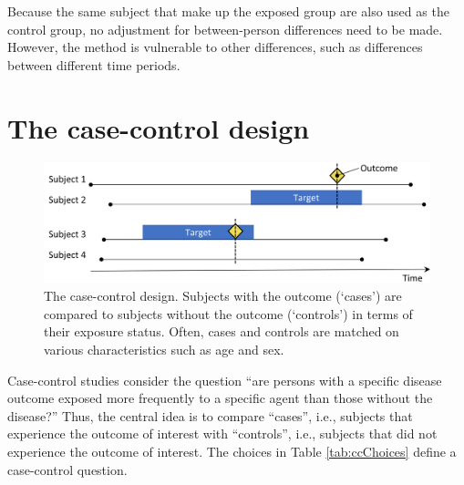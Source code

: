 \documentclass[11pt]{book}
\begin{document}
Because the same subject that make up the exposed group are also used as
the control group, no adjustment for between-person differences need to
be made. However, the method is vulnerable to other differences, such as
differences between different time periods.

\section{The case-control design}\label{the-case-control-design}

\begin{figure}

{\centering \includegraphics[width=0.9\linewidth]{images/PopulationLevelEstimation/caseControl} 

}

\caption{The case-control design. Subjects with the outcome (‘cases’) are compared to subjects without the outcome (‘controls’) in terms of their exposure status. Often, cases and controls are matched on various characteristics such as age and sex.}\label{fig:caseControl}
\end{figure}

Case-control \citep{vandenbroucke_2012} studies consider the question
``are persons with a specific disease outcome exposed more frequently to
a specific agent than those without the disease?'' Thus, the central
idea is to compare ``cases'', i.e., subjects that experience the outcome
of interest with ``controls'', i.e., subjects that did not experience
the outcome of interest. The choices in Table \ref{tab:ccChoices} define
a case-control question.
\end{document}
